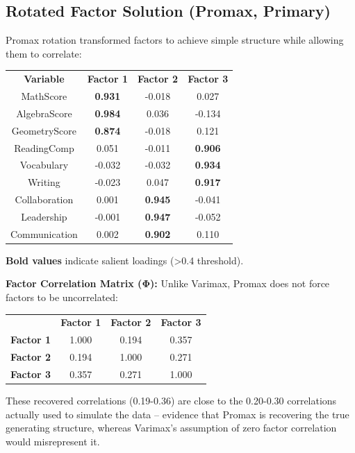 \documentclass[
]{article}
\begin{document}
\subsection{Rotated Factor Solution (Promax, Primary)}

Promax rotation transformed factors to achieve simple structure while
allowing them to correlate:

{\def\LTcaptype{none} %
\begin{longtable}[]{@{}cccc@{}}
\toprule\noalign{}
\endhead
\bottomrule\noalign{}
\endlastfoot
\textbf{Variable} & \textbf{Factor 1} & \textbf{Factor 2} &
\textbf{Factor 3} \\
MathScore & \textbf{0.931} & -0.018 & 0.027 \\
AlgebraScore & \textbf{0.984} & 0.036 & -0.134 \\
GeometryScore & \textbf{0.874} & -0.018 & 0.121 \\
ReadingComp & 0.051 & -0.011 & \textbf{0.906} \\
Vocabulary & -0.032 & -0.032 & \textbf{0.934} \\
Writing & -0.023 & 0.047 & \textbf{0.917} \\
Collaboration & 0.001 & \textbf{0.945} & -0.041 \\
Leadership & -0.001 & \textbf{0.947} & -0.052 \\
Communication & 0.002 & \textbf{0.902} & 0.110 \\
\end{longtable}
}

\textbf{Bold values} indicate salient loadings (\textgreater0.4
threshold).

\textbf{Factor Correlation Matrix (Φ):} Unlike Varimax, Promax does not
force factors to be uncorrelated:

{\def\LTcaptype{none} %
\begin{longtable}[]{@{}cccc@{}}
\toprule\noalign{}
\endhead
\bottomrule\noalign{}
\endlastfoot
& \textbf{Factor 1} & \textbf{Factor 2} & \textbf{Factor 3} \\
\textbf{Factor 1} & 1.000 & 0.194 & 0.357 \\
\textbf{Factor 2} & 0.194 & 1.000 & 0.271 \\
\textbf{Factor 3} & 0.357 & 0.271 & 1.000 \\
\end{longtable}
}

These recovered correlations (0.19-0.36) are close to the 0.20-0.30
correlations actually used to simulate the data -- evidence that Promax
is recovering the true generating structure, whereas Varimax's
assumption of zero factor correlation would misrepresent it.
\end{document}
